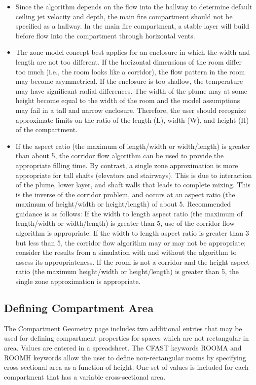 \begin{itemize}
\item  Since the algorithm depends on the flow into the hallway to determine default ceiling jet velocity and depth, the main fire compartment should not be specified as a hallway. In the main fire compartment, a stable layer will build before flow into the compartment through horizontal vents.
\item The zone model concept best applies for an enclosure in which the width and length are not too different.  If the horizontal dimensions of the room differ too much (i.e., the room looks like a corridor), the flow pattern in the room may become asymmetrical. If the enclosure is too shallow, the temperature may have significant radial differences. The width of the plume may at some height become equal to the width of the room and the model assumptions may fail in a tall and narrow enclosure. Therefore, the user should recognize approximate limits on the ratio of the length (L), width (W), and height (H) of the compartment.
\item If the aspect ratio (the maximum of length/width or width/length) is greater than about 5, the corridor flow algorithm can be used to provide the appropriate filling time. By contrast, a single zone approximation is more appropriate for tall shafts (elevators and stairways).  This is due to interaction of the plume, lower layer, and shaft walls that leads to complete mixing.  This is the inverse of the corridor problem, and occurs at an aspect ratio (the maximum of height/width or height/length) of about 5. Recommended guidance is as follows:  If the width to length aspect ratio (the maximum of length/width or width/length) is greater than 5, use of the corridor flow algorithm is appropriate. If the width to length aspect ratio is greater than 3 but less than 5, the corridor flow algorithm may or may not be appropriate; consider the results from a simulation with and without the algorithm to assess its appropriateness. If the room is not a corridor and the height aspect ratio (the maximum height/width or height/length) is greater than 5, the single zone approximation is appropriate.
\end{itemize}

\subsection{Defining Compartment Area}

The Compartment Geometry page includes two additional entries that may be used for defining compartment properties for spaces which are not rectangular in area.  Values are entered in a spreadsheet. The CFAST keywords ROOMA and ROOMH keywords allow the user to define non-rectangular rooms by specifying cross-sectional area as a function of height. One set of values is included for each compartment that has a variable cross-sectional area.

